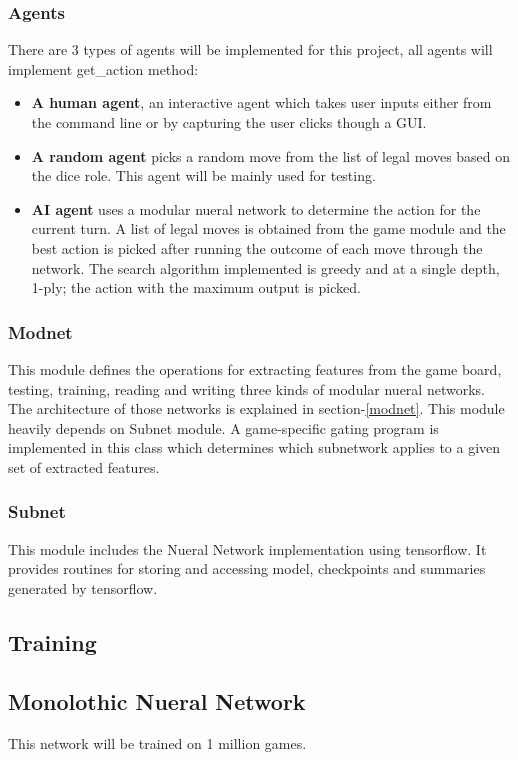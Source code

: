 \documentclass[12pt,a4paper]{article}
\begin{document}
\subsubsection{Agents}
There are 3 types of agents will be implemented for this project, all agents will implement get\_action method: 
\begin{itemize}
    \item \textbf{A human agent}, an interactive agent which takes user inputs either from the command line or by capturing the user clicks though a GUI.
    \item \textbf{A random agent} picks a random move from the list of legal moves based on the dice role. This agent will be mainly used for testing.
    \item \textbf{AI agent} uses a modular nueral network to determine the action for the current turn. A list of legal moves is obtained from the game module and the best action is picked after running the outcome of each move through the network. The search algorithm implemented is greedy and at a single depth, 1-ply; the action with the maximum output is picked.
\end{itemize}

\subsubsection{Modnet}
This module defines the operations for extracting features from the game board, testing, training, reading and writing three kinds of modular nueral networks. The architecture of those networks is explained in section-\ref{modnet}. This module heavily depends on Subnet module. A game-specific gating program is implemented in this class which determines which subnetwork applies to a given set of extracted features.

\subsubsection{Subnet}
This module includes the Nueral Network implementation using tensorflow. It provides routines for storing and accessing model, checkpoints and summaries generated by tensorflow.  


\subsection{Training}
\subsection{Monolothic Nueral Network}
This network will be trained on 1 million games. 
\end{document}
